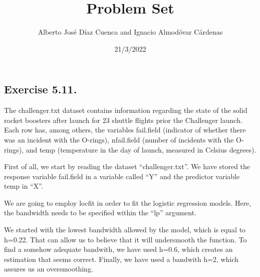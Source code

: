 \documentclass[
]{article}
\title{Problem Set}
\author{Alberto José Díaz Cuenca and Ignacio Almodóvar Cárdenas}
\date{21/3/2022}
\begin{document}
\maketitle

\hypertarget{exercise-5.11.}{%
\subsection{Exercise 5.11.}\label{exercise-5.11.}}

The challenger.txt dataset contains information regarding the state of
the solid rocket boosters after launch for 23 shuttle flights prior the
Challenger launch. Each row has, among others, the variables fail.field
(indicator of whether there was an incident with the O-rings),
nfail.field (number of incidents with the O-rings), and temp
(temperature in the day of launch, measured in Celsius degrees).

First of all, we start by reading the dataset ``challenger.txt''. We
have stored the response variable fail.field in a variable called ``Y''
and the predictor variable temp in ``X''.

We are going to employ locfit in order to fit the logistic regression
models. Here, the bandwidth needs to be specified within the ``lp''
argument.

We started with the lowest bandwidth allowed by the model, which is
equal to h=0.22. That can allow us to believe that it will undersmooth
the function. To find a somehow adequate bandwith, we have used h=0.6,
which creates an estimation that seems correct. Finally, we have used a
bandwith h=2, which assures us an oversmoothing.
\end{document}
